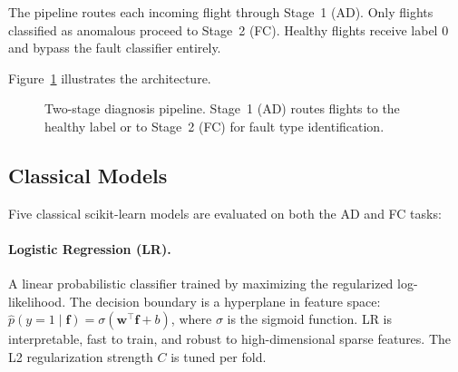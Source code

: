 The pipeline routes each incoming flight through Stage~1 (AD). Only flights
classified as anomalous proceed to Stage~2 (FC). Healthy flights receive label 0
and bypass the fault classifier entirely.

Figure~\ref{fig:pipeline} illustrates the architecture.

\begin{figure}[H]
    \centering
    \caption{Two-stage diagnosis pipeline. Stage~1 (AD) routes flights to the
             healthy label or to Stage~2 (FC) for fault type identification.}
    \label{fig:pipeline}
\end{figure}

\subsection{Classical Models}
\label{subsec:classical}

Five classical scikit-learn models are evaluated on both the AD and FC tasks:

\paragraph{Logistic Regression (LR).}
A linear probabilistic classifier trained by maximizing the regularized
log-likelihood. The decision boundary is a hyperplane in feature space:
$\hat{p}(y=1 \mid \mathbf{f}) = \sigma(\mathbf{w}^\top \mathbf{f} + b)$,
where $\sigma$ is the sigmoid function. LR is interpretable, fast to train,
and robust to high-dimensional sparse features. The L2 regularization strength
$C$ is tuned per fold.

